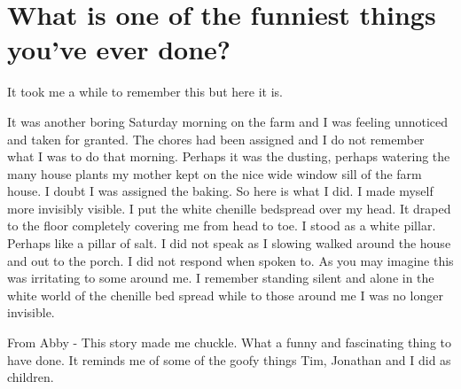 \section{What is one of the funniest things you've ever done?}
It took me a while to remember this but here it is.

It was another boring Saturday morning on the farm and I was feeling unnoticed and taken for granted.
The chores had been assigned and I do not remember what I was to do that morning.
Perhaps it was the dusting, perhaps watering the many house plants my mother kept on the nice wide window sill of the farm house.
I doubt I was assigned the baking.
So here is what I did.
I made myself more invisibly visible.
I put the white chenille bedspread over my head.
It draped to the floor completely covering me from head to toe.
I stood as a white pillar.
Perhaps like a pillar of salt.
I did not speak as I slowing walked around the house and out to the porch.
I did not respond when spoken to.
As you may imagine this was irritating to some around me.
I remember standing silent and alone in the white world of the chenille bed spread while to those around me I was no longer invisible.

From Abby - This story made me chuckle.
What a funny and fascinating thing to have done.
It reminds me of some of the goofy things Tim, Jonathan and I did as children.





